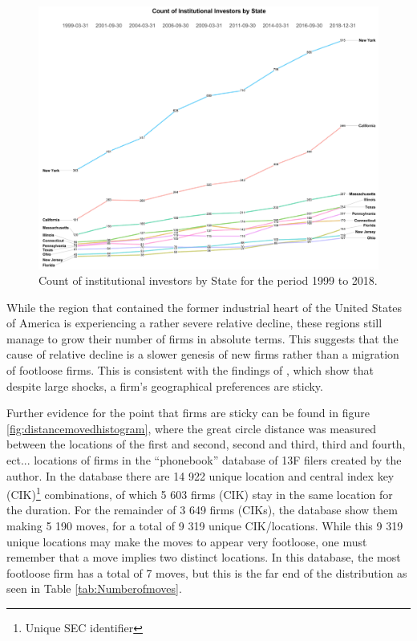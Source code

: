 \begin{figure}[h]
	\centering
	\includegraphics[width=1\linewidth]{Figures/ChapterIII/Count_II_BY_State}
	\caption[Count of Institutional Investors by State]{Count of institutional investors by State for the period 1999 to 2018.}
	\label{fig:countiibystate}
\end{figure}

While the region that contained the former industrial heart of the United States of America is experiencing a rather severe relative decline, these regions still manage to grow their number of firms in absolute terms.  This suggests that the cause of relative decline is a slower genesis of new firms rather than a migration of footloose firms.  This is consistent with the findings of \cite{gongthe2012}, which show that despite large shocks, a firm's geographical preferences are sticky.  

Further evidence for the point that firms are sticky can be found in figure \ref{fig:distancemovedhistogram}, where the great circle distance was measured between the locations of the first and second, second and third, third and fourth, ect... locations of firms in the ``phonebook'' database of 13F filers created by the author.  In the database there are 14 922 unique location and central index key (CIK)\footnote{Unique SEC identifier} combinations, of which 5 603 firms (CIK) stay in the same location for the duration.  For the remainder of 3 649 firms (CIKs), the database show them making 5 190 moves, for a total of 9 319 unique CIK/locations.  While this 9 319 unique locations may make the moves to appear very footloose, one must remember that a move implies two distinct locations.  In this database, the most footloose firm has a total of 7 moves, but this is the far end of the distribution as seen in Table \ref{tab:Numberofmoves}.  

